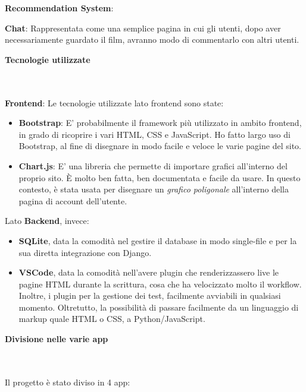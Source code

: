 \documentclass[12pt]{article}
\begin{document}
	\noindent \textbf{Recommendation System}: 
	
	\noindent \textbf{Chat}: Rappresentata come una semplice pagina in cui gli utenti, dopo aver necessariamente guardato il film, avranno modo di commentarlo con altri utenti.
	
	\pagebreak
	
	
	\noindent \centerline {\Huge \textbf{Tecnologie utilizzate}} \\ \\
	
	\noindent \textbf{Frontend}: Le tecnologie utilizzate lato frontend sono state: 
	\begin{itemize}
		\item \textbf{Bootstrap}: E' probabilmente il framework più utilizzato in ambito frontend, in grado di ricoprire i vari HTML, CSS e JavaScript. Ho fatto largo uso di Bootstrap, al fine di disegnare in modo facile e veloce le varie pagine del sito. \\
		
		\item \textbf{Chart.js}: E' una libreria che permette di importare grafici all'interno del proprio sito. È molto ben fatta, ben documentata e facile da usare. In questo contesto, è stata usata per disegnare un \textit{grafico poligonale} all'interno della pagina di account dell'utente. \\
	\end{itemize}

	\noindent Lato \textbf{Backend}, invece: 
	\begin{itemize}
		\item \textbf{SQLite}, data la comodità nel gestire il database in modo single-file e per la sua diretta integrazione con Django. \\
		
		\item \textbf{VSCode}, data la comodità nell'avere plugin che renderizzassero live le pagine HTML durante la scrittura, cosa che ha velocizzato molto il workflow. Inoltre, i plugin per la gestione dei test, facilmente avviabili in qualsiasi momento. Oltretutto, la possibilità di passare facilmente da un linguaggio di markup quale HTML o CSS, a Python/JavaScript.
	\end{itemize}
	\pagebreak

	
	\noindent \centerline {\Huge \textbf{Divisione nelle varie app}} \\ \\ 
	Il progetto è stato diviso in 4 app:
	
\end{document}
